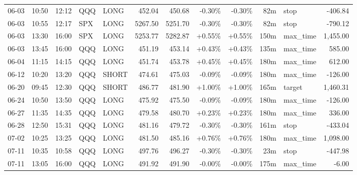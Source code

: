 \documentclass[11pt,a4paper]{article}
\begin{document}
\begin{center}
\begin{longtable}{>{\color{txtmain}}l l l l l r r r r r >{\color{txtmain}}l r}
06-03 & 10:50 & 12:12 & QQQ & LONG & 452.04 & 450.68 & \textcolor{lossred}{-0.30\%} & \textcolor{lossred}{-0.30\%} & 82m & stop & \textcolor{lossred}{-406.84} \\
06-03 & 10:55 & 12:17 & SPX & LONG & 5267.50 & 5251.70 & \textcolor{lossred}{-0.30\%} & \textcolor{lossred}{-0.30\%} & 82m & stop & \textcolor{lossred}{-790.12} \\
06-03 & 13:30 & 16:00 & SPX & LONG & 5253.77 & 5282.87 & \textcolor{wingreen}{+0.55\%} & \textcolor{wingreen}{+0.55\%} & 150m & max\_time & \textcolor{wingreen}{1,455.00} \\
06-03 & 13:45 & 16:00 & QQQ & LONG & 451.19 & 453.14 & \textcolor{wingreen}{+0.43\%} & \textcolor{wingreen}{+0.43\%} & 135m & max\_time & \textcolor{wingreen}{585.00} \\
06-04 & 11:15 & 14:15 & QQQ & LONG & 451.74 & 453.78 & \textcolor{wingreen}{+0.45\%} & \textcolor{wingreen}{+0.45\%} & 180m & max\_time & \textcolor{wingreen}{612.00} \\
06-12 & 10:20 & 13:20 & QQQ & SHORT & 474.61 & 475.03 & \textcolor{lossred}{-0.09\%} & \textcolor{lossred}{-0.09\%} & 180m & max\_time & \textcolor{lossred}{-126.00} \\
06-20 & 09:45 & 12:30 & QQQ & SHORT & 486.77 & 481.90 & \textcolor{wingreen}{+1.00\%} & \textcolor{wingreen}{+1.00\%} & 165m & target & \textcolor{wingreen}{1,460.31} \\
06-24 & 10:50 & 13:50 & QQQ & LONG & 475.92 & 475.50 & \textcolor{lossred}{-0.09\%} & \textcolor{lossred}{-0.09\%} & 180m & max\_time & \textcolor{lossred}{-126.00} \\
06-27 & 11:35 & 14:35 & QQQ & LONG & 479.58 & 480.70 & \textcolor{wingreen}{+0.23\%} & \textcolor{wingreen}{+0.23\%} & 180m & max\_time & \textcolor{wingreen}{336.00} \\
06-28 & 12:50 & 15:31 & QQQ & LONG & 481.16 & 479.72 & \textcolor{lossred}{-0.30\%} & \textcolor{lossred}{-0.30\%} & 161m & stop & \textcolor{lossred}{-433.04} \\
07-02 & 10:25 & 13:25 & QQQ & LONG & 481.50 & 485.16 & \textcolor{wingreen}{+0.76\%} & \textcolor{wingreen}{+0.76\%} & 180m & max\_time & \textcolor{wingreen}{1,098.00} \\
07-11 & 10:35 & 10:58 & QQQ & LONG & 497.76 & 496.27 & \textcolor{lossred}{-0.30\%} & \textcolor{lossred}{-0.30\%} & 23m & stop & \textcolor{lossred}{-447.98} \\
07-11 & 13:05 & 16:00 & QQQ & LONG & 491.92 & 491.90 & \textcolor{lossred}{-0.00\%} & \textcolor{lossred}{-0.00\%} & 175m & max\_time & \textcolor{lossred}{-6.00} \\

\end{longtable}
\end{center}
\end{document}

